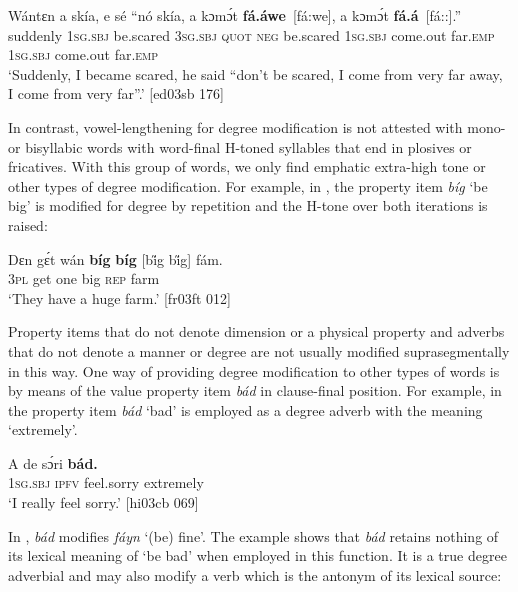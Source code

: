 \ea%
    \label{ex:key:895}
    \gll Wántɛn  a    skía,      e    sé  “nó  skía,      a    kɔmɔ́t
\textbf{fá.áwe}~\textup{[fá:we]},  a    kɔmɔ́t    \textbf{fá.á}~\textup{[fá::]}.”\\
suddenly  \textsc{1sg.sbj}  be.scared  \textsc{3sg.sbj}  \textsc{quot}  \phantom{“}\textsc{neg}  be.scared  \textsc{1sg.sbj}  come.out
far.\textsc{emp}      \textsc{1sg.sbj}  come.out  far.\textsc{emp}\\

\glt ‘Suddenly, I became scared, he said “don’t be scared, I come from very far away, 
I come from very far”.’ [ed03sb 176]
\z

In contrast, vowel-lengthening for degree modification is not attested with mono- or bisyllabic words with word-final H-toned syllables that end in plosives or fricatives. With this group of words, we only find emphatic extra-high tone or other types of degree modification. For example, in , the property item \textit{bíg} ‘be big’ is modified for degree by repetition and the H-tone over both iterations is raised: 


\ea%
    \label{ex:key:896}
    \gll Dɛn  gɛ́t  wán  \textbf{bíg}  \textbf{bíg} \textup{[b\H{i}g b\H{i}g]} fám.\\
\textsc{3pl}  get  one  big  \textsc{rep} {}     farm\\

\glt ‘They have a huge farm.’ [fr03ft 012]
\z

Property items that do not denote dimension or a physical property and adverbs that do not denote a manner or degree are not usually modified suprasegmentally in this way. One way of providing degree modification to other types of words is by means of the value property item \textit{bád} in clause-final position. For example, in  the property item \textit{bád} ‘bad’ is employed as a degree adverb with the meaning ‘extremely’. 


\ea%
    \label{ex:key:897}
    \gll A    de  sɔ́ri      \textbf{bád.}\\
\textsc{1sg.sbj}  \textsc{ipfv}  feel.sorry  extremely\\

\glt ‘I really feel sorry.’ [hi03cb 069]
\z

In , \textit{bád} modifies \textit{fáyn} ‘(be) fine’. The example shows that \textit{bád} retains nothing of its lexical meaning of ‘be bad’ when employed in this function. It is a true degree adverbial and may also modify a verb which is the antonym of its lexical source:


